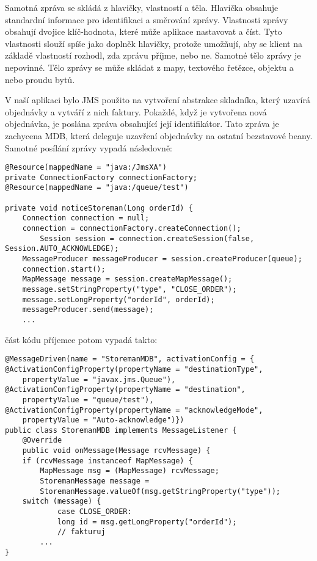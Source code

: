 \documentclass[122pt,oneside]{fithesis}
\begin{document}
Samotná zpráva se skládá z hlavičky, vlastností a těla. Hlavička obsahuje standardní informace pro identifikaci a směrování zprávy. Vlastnosti zprávy obsahují dvojice klíč-hodnota, které může aplikace nastavovat a číst. Tyto vlastnosti slouží spíše jako doplněk hlavičky, protože umožňují, aby se klient na základě vlastností rozhodl, zda zprávu příjme, nebo ne. Samotné tělo zprávy je nepovinné. Tělo zprávy se může skládat z mapy, textového řetězce, objektu a nebo proudu bytů.

V naší aplikaci bylo JMS použito na vytvoření abstrakce skladníka, který uzavírá objednávky a vytváří z nich faktury. Pokaždé, když je vytvořena nová objednávka, je poslána zpráva obsahující její identifikátor. Tato zpráva je zachycena MDB, která deleguje uzavření objednávky na ostatní bezstavové beany. Samotné posílání zprávy vypadá následovně:

\begin{lstlisting}
@Resource(mappedName = "java:/JmsXA")
private ConnectionFactory connectionFactory;
@Resource(mappedName = "java:/queue/test")

private void noticeStoreman(Long orderId) {
	Connection connection = null;
	connection = connectionFactory.createConnection();
		Session session = connection.createSession(false, Session.AUTO_ACKNOWLEDGE);
	MessageProducer messageProducer = session.createProducer(queue);
	connection.start();
	MapMessage message = session.createMapMessage();
	message.setStringProperty("type", "CLOSE_ORDER");
	message.setLongProperty("orderId", orderId);
	messageProducer.send(message);
	... 
\end{lstlisting}

část kódu příjemce potom vypadá takto:

\begin{lstlisting}
@MessageDriven(name = "StoremanMDB", activationConfig = {
@ActivationConfigProperty(propertyName = "destinationType", 
	propertyValue = "javax.jms.Queue"),
@ActivationConfigProperty(propertyName = "destination", 
	propertyValue = "queue/test"),
@ActivationConfigProperty(propertyName = "acknowledgeMode", 
	propertyValue = "Auto-acknowledge")})
public class StoremanMDB implements MessageListener {
	@Override
	public void onMessage(Message rcvMessage) {
	if (rcvMessage instanceof MapMessage) {
		MapMessage msg = (MapMessage) rcvMessage;
		StoremanMessage message =
		StoremanMessage.valueOf(msg.getStringProperty("type"));
	switch (message) {
			case CLOSE_ORDER:
			long id = msg.getLongProperty("orderId");
			// fakturuj
		...
}
\end{lstlisting}
\end{document}

